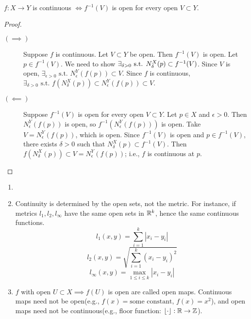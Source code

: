 \begin{theorem}
	$f: X\to Y$ is continuous $\Leftrightarrow  f^{-1}(V)$ is open for every open $V \subset Y$.
	\begin{proof}
		\begin{description}
			\item[$(\implies)$]
			      Suppose $f$ is continuous. Let $V \subset Y$ be open. Then $f^{-1}(V)$ is open.
			      Let $p \in f^{-1}(V)$. We need to show {$\exists_{\delta >0} \text{ s.t. } \linebreak N_{\delta}^{X}(p) \subset f^{-1}(V)$.} Since $V$ is open, $\exists_{\epsilon > 0} \text{ s.t. } N_{\epsilon}^{Y}(f(p)) \subset V$.
			      Since $f$ is continuous, $\exists_{\delta > 0} \text{ s.t. } f(N_{\delta}^{X}(p)) \subset N_{\epsilon}^{Y}(f(p)) \subset V$.
			\item[$(\impliedby)$]
			      Suppose $f^{-1}(V)$ is open for every open $V \subset Y$. Let $p \in X$ and $\epsilon>0$. Then $N_{\epsilon}^{Y}(f(p))$ is open, so $f^{-1}(N_{\epsilon}^{Y}(f(p)))$ is open. Take $V=N_{\epsilon}^{Y}(f(p))$, which is open.
			      Since $f^{-1}(V)$ is open and $p \in f^{-1}(V)$, there exists $\delta>0$ such that $N_{\delta}^{X}(p) \subset f^{-1}(V)$. Then $f(N_{\delta}^{X}(p)) \subset V=N_{\epsilon}^{Y}(f(p))$; i.e., $f$ is continuous at $p$.
		\end{description}
	\end{proof}
	\begin{remark}\hfill
		\begin{enumerate}
			\item
			      \hfill\\
			\item Continuity is determined by the open sets, not the metric. For instance, if metrics $l_1,l_2,l_{\infty}$ have the same open sets in $\mathbb{R}^{k}$, hence the same continuous functions.
			      \[
				      l_1(x,y)=\sum_{i=1}^{k}{|x_i-y_i|}
			      \]
			      \[
				      l_2(x,y)=\sqrt{\sum_{i=1}^{k}{(x_i-y_i)^2}}
			      \]
			      \[
				      l_{\infty}(x,y)=\max_{1\le i\le k}{|x_i-y_i|}
			      \]
			\item $f$ with open $U \subset X \implies f(U)$ is open are called open maps. Continuous maps need not be open(e.g., $f(x)=\text{some constant}$, $f(x)=x^2$), and open maps need not be continuous(e.g., floor function: $\left\lfloor \cdot \right\rfloor: \mathbb{R}\to \mathbb{Z}$).
		\end{enumerate}
	\end{remark}
\end{theorem}

